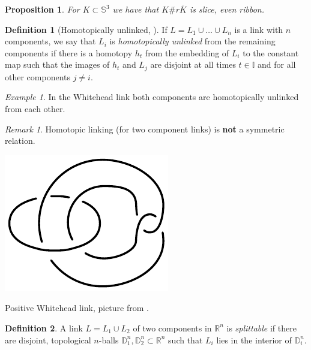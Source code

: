 \documentclass[nobib]{tufte-book} %
\newtheorem{proposition}{Proposition}
\theoremstyle{definition}
\newtheorem{definition}{Definition}
\theoremstyle{remark}
\newtheorem{remark}{Remark}
\newtheorem{example}{Example}
\newcommand{\sphere}[1]{\mathbb{S}^{#1}}
\newcommand{\disk}[1]{\mathbb{D}^{#1}}
\newcommand{\interval}{\mathbb{I}}
\newcommand{\R}{\mathbb{R}}
\begin{document}
\begin{proposition}
	For $K \subset \sphere{3}$ we have that
	$K \# r \overline{K}$ is slice, even ribbon.
\end{proposition}


\begin{definition}[Homotopically unlinked,
		{\citep[3.F.9.]{rolfsen2003knots}}]
	If $L = L_{1} \cup \ldots \cup L_{n}$ is a link with $n$
	components, we say that $L_i$ is
	\textit{homotopically unlinked} 
	from the remaining components if there is
	a homotopy $h_{t}$ from the embedding of $L_{i}$ to the constant
	map such that the images of $h_{t}$ and $L_{j}$ are disjoint
	at all times $t \in \interval$ and for all other components $j \ne i$.
\end{definition}

\begin{example}
	In the Whitehead link both components are
	homotopically unlinked from each other.
\end{example}

\begin{remark}
	Homotopic linking (for two component links)
	is \textbf{not} a symmetric relation.
	\begin{marginfigure}
		\begin{center}
			\includegraphics[width=0.5\linewidth]{./pictures/positive_whitehead_link.pdf}
		\end{center}
		\caption{Positive Whitehead link,
			picture from \citep{meier2015distinguishing}.}
		\label{fig:positive_whitehead_link}
	\end{marginfigure}
\end{remark}

\begin{definition}
	A link $L = L_{1} \cup L_{2}$ of two components in $\R^{n}$
	is \textit{splittable} 
	if there are disjoint, topological $n$-balls $\disk{n}_{1}, \disk{n}_{2} \subset \R^{n}$
	such that $L_{i}$ lies in the interior of $\disk{n}_{i}$.
\end{definition}
\end{document}
